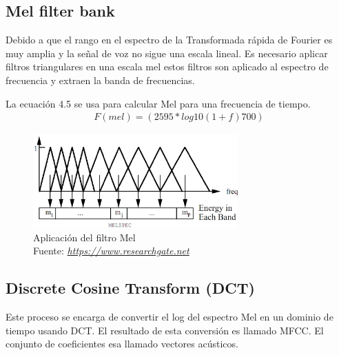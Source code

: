 	\subsection{Mel filter bank}
	Debido a que el rango en el espectro de la Transformada rápida de Fourier es muy amplia y la señal de voz no sigue una escala lineal. Es necesario aplicar filtros triangulares en una escala mel estos filtros son aplicado al espectro de frecuencia y extraen la banda de frecuencias.
	
	La ecuación 4.5 se usa para calcular Mel para una frecuencia de tiempo.
		\begin{equation}
			\label{TFFs}
			\begin{aligned}
			F(mel)=(2595\ast log10(1+f)700)
			\end{aligned}
		\end{equation}	
		
		
		\begin{figure}[H]
			\centering
			\includegraphics[width=0.7\textwidth]{Figures/melfilter.png}
			\caption{Aplicación del filtro Mel \\ Fuente:  \href{https://www.researchgate.net/figure/Mel-Scale-Filter-Bank-14\_fig2\_280027126}{\textit{https://www.researchgate.net}}}
			\label{onda}
		\end{figure} 
	\subsection{Discrete Cosine Transform (DCT)}
	Este proceso se encarga de convertir el log del espectro Mel en un dominio de tiempo usando DCT. El resultado de esta conversión es llamado MFCC. El conjunto de coeficientes esa llamado vectores acústicos.
	
